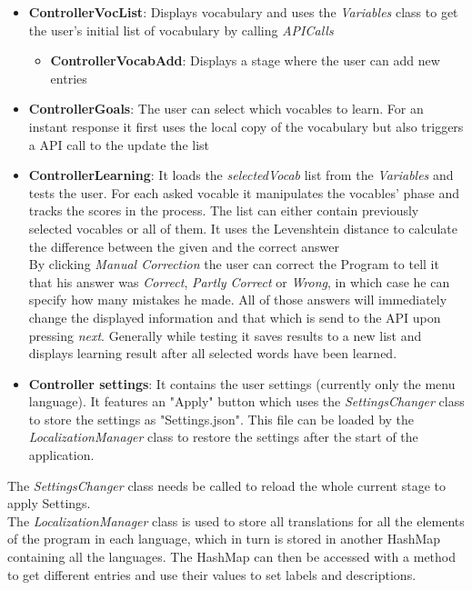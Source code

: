 \begin{itemize}
    \item \textbf{ControllerVocList}: Displays vocabulary and uses the \textit{Variables} class to get the user's initial list of vocabulary by calling \textit{APICalls} 
    \begin{itemize}
        \item \textbf{ControllerVocabAdd}: Displays a stage where the user can add new entries
    \end{itemize}
    \item \textbf{ControllerGoals}: The user can select which vocables to learn. For an instant response it first uses the local copy of the vocabulary but also triggers a API call to the update the list
    \item \textbf{ControllerLearning}: It loads the \textit{selectedVocab} list from the \textit{Variables} and tests the user. For each asked vocable it manipulates the vocables' phase and tracks the scores in the process. The list can either contain previously selected vocables or all of them. It uses the Levenshtein distance to calculate the difference between the given and the correct answer\\
    By clicking \textit{Manual Correction} the user can correct the Program to tell it that his answer was \textit{Correct}, \textit{Partly Correct} or \textit{Wrong}, in which case he can specify how many mistakes he made.
    All of those answers will immediately change the displayed information and that which is send to the API upon pressing \textit{next}.
    Generally while testing it saves results to a new list and displays learning result after all selected words have been learned.
    \item \textbf{Controller settings}: It contains the user settings (currently only the menu language). It features an "Apply" button which uses the \textit{SettingsChanger} class to store the settings as "Settings.json". This file can be loaded by the \textit{LocalizationManager} class to restore the settings after the start of the application.
\end{itemize}
The \textit{SettingsChanger} class needs be called to reload the whole current stage to apply Settings.\\
The \textit{LocalizationManager} class is used to store all translations for all the elements of the program in each language, which in turn is stored in another HashMap containing all the languages.
The HashMap can then be accessed with a method to get different entries and use their values to set labels and descriptions.\\
